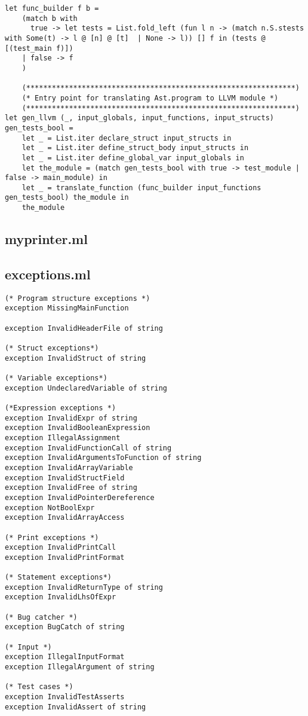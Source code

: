 \documentclass{article}
\begin{document}
\begin{lstlisting}
let func_builder f b = 
	(match b with 
	  true -> let tests = List.fold_left (fun l n -> (match n.S.stests with Some(t) -> l @ [n] @ [t]  | None -> l)) [] f in (tests @ [(test_main f)]) 
	| false -> f
	)

	(***************************************************************)
	(* Entry point for translating Ast.program to LLVM module *)
	(***************************************************************)
let gen_llvm (_, input_globals, input_functions, input_structs) gen_tests_bool = 
	let _ = List.iter declare_struct input_structs in
	let _ = List.iter define_struct_body input_structs in
	let _ = List.iter define_global_var input_globals in
	let the_module = (match gen_tests_bool with true -> test_module | false -> main_module) in
	let _ = translate_function (func_builder input_functions gen_tests_bool) the_module in
	the_module
\end{lstlisting}
\newpage

\subsection{myprinter.ml}
\newpage

\subsection{exceptions.ml}
\begin{lstlisting}
(* Program structure exceptions *)
exception MissingMainFunction

exception InvalidHeaderFile of string

(* Struct exceptions*)
exception InvalidStruct of string

(* Variable exceptions*)
exception UndeclaredVariable of string

(*Expression exceptions *)
exception InvalidExpr of string
exception InvalidBooleanExpression 
exception IllegalAssignment
exception InvalidFunctionCall of string
exception InvalidArgumentsToFunction of string
exception InvalidArrayVariable
exception InvalidStructField
exception InvalidFree of string
exception InvalidPointerDereference
exception NotBoolExpr
exception InvalidArrayAccess

(* Print exceptions *)
exception InvalidPrintCall
exception InvalidPrintFormat

(* Statement exceptions*)
exception InvalidReturnType of string
exception InvalidLhsOfExpr

(* Bug catcher *)
exception BugCatch of string

(* Input *)
exception IllegalInputFormat
exception IllegalArgument of string

(* Test cases *)
exception InvalidTestAsserts
exception InvalidAssert of string
\end{lstlisting}
\newpage
\end{document}
